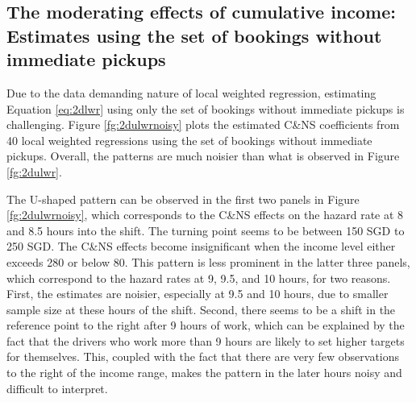 \documentclass[reviewmode,AEJ]{AEA}
\begin{document}
\begin{appendices}
\begin{table}
\end{table}






\section{The moderating effects of cumulative income: Estimates using the set of bookings without immediate pickups}
\label{apx:CI}
Due to the data demanding nature of local weighted regression, estimating Equation \eqref{eq:2dlwr} using only the set of bookings without immediate pickups is challenging. Figure \ref{fg:2dulwrnoisy} plots the estimated C\&NS coefficients from 40 local weighted regressions using the set of bookings without immediate pickups. Overall, the patterns are much noisier than what is observed in Figure \ref{fg:2dulwr}. 

The U-shaped pattern can be observed in the first two panels in Figure \ref{fg:2dulwrnoisy}, which corresponds to the C\&NS effects on the hazard rate at 8 and 8.5 hours into the shift. The turning point seems to be between 150 SGD to 250 SGD. The C\&NS effects become insignificant when the income level either exceeds 280 or below 80. This pattern is less prominent in the latter three panels, which correspond to the hazard rates at 9, 9.5, and 10 hours, for two reasons. First, the estimates are noisier, especially at 9.5 and 10 hours, due to smaller sample size at these hours of the shift. Second, there seems to be a shift in the reference point  to the right after 9 hours of work, which can be explained by the fact that the drivers who work more than 9 hours are likely to set higher targets for themselves. This, coupled with the fact that there are very few observations to the right of the income range, makes the pattern in the later hours noisy and difficult to interpret. 




\end{appendices}
\end{document}
